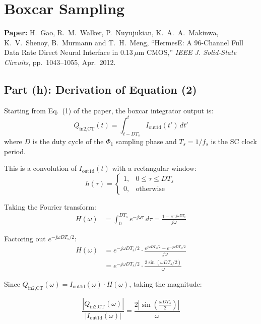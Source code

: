 \documentclass{article}
\begin{document}
\section{Boxcar Sampling}

\textbf{Paper:} H.~Gao, R.~M.~Walker, P.~Nuyujukian, K.~A.~A.~Makinwa, K.~V.~Shenoy, B.~Murmann and T.~H.~Meng, ``HermesE: A 96-Channel Full Data Rate Direct Neural Interface in 0.13\,$\mu$m CMOS,'' \textit{IEEE J. Solid-State Circuits}, pp.~1043--1055, Apr.~2012.

\subsection{Part (h): Derivation of Equation (2)}

Starting from Eq.~(1) of the paper, the boxcar integrator output is:
\begin{equation}
    Q_\text{in2,CT}(t) = \int_{t - DT_s}^{t} I_\text{out1d}(t')\, dt'
    \label{eq:boxcar_time}
\end{equation}
where $D$ is the duty cycle of the $\Phi_1$ sampling phase and $T_s = 1/f_s$ is the SC clock period.

This is a convolution of $I_\text{out1d}(t)$ with a rectangular window:
\begin{equation}
    h(\tau) = \begin{cases} 1, & 0 \leq \tau \leq DT_s \\ 0, & \text{otherwise} \end{cases}
\end{equation}

Taking the Fourier transform:
\begin{align}
    H(\omega) &= \int_0^{DT_s} e^{-j\omega\tau}\, d\tau = \frac{1 - e^{-j\omega DT_s}}{j\omega}
\end{align}

Factoring out $e^{-j\omega DT_s/2}$:
\begin{align}
    H(\omega) &= e^{-j\omega DT_s/2} \cdot \frac{e^{j\omega DT_s/2} - e^{-j\omega DT_s/2}}{j\omega} \nonumber \\
    &= e^{-j\omega DT_s/2} \cdot \frac{2\sin(\omega DT_s/2)}{\omega}
\end{align}

Since $Q_\text{in2,CT}(\omega) = I_\text{out1d}(\omega) \cdot H(\omega)$, taking the magnitude:

\begin{equation}
    \boxed{\frac{|Q_\text{in2,CT}(\omega)|}{|I_\text{out1d}(\omega)|} = \frac{2\left|\sin\!\left(\frac{\omega DT_s}{2}\right)\right|}{\omega}}
    \label{eq:eq2_derived}
\end{equation}
\end{document}
